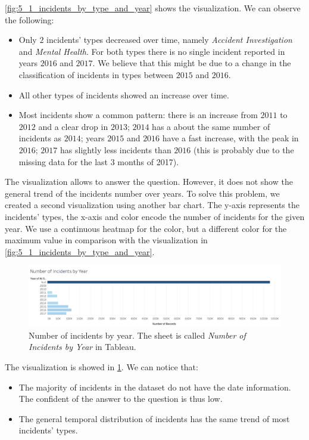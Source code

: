 \cref{fig:5_1_incidents_by_type_and_year} shows the visualization.
We can observe the following:
\begin{itemize}
    \item Only $2$ incidents' types decreased over time, namely \textit{Accident Investigation} and \textit{Mental Health}. For both types there is no single incident reported in years $2016$ and $2017$. We believe that this might be due to a change in the classification of incidents in types between $2015$ and $2016$.
    \item All other types of incidents showed an increase over time.
    \item Most incidents show a common pattern: there is an increase from $2011$ to $2012$ and a clear drop in $2013$; $2014$ has a about the same number of incidents as $2014$; years $2015$ and $2016$ have a fast increase, with the peak in $2016$; $2017$ has slightly less incidents than $2016$ (this is probably due to the missing data for the last $3$ months of 2017).
\end{itemize}

The visualization allows to answer the question.
However, it does not show the general trend of the incidents number over years.
To solve this problem, we created a second visualization using another bar chart.
The y-axis represents the incidents' types, the x-axis and color encode the number of incidents for the given year.
We use a continuous heatmap for the color, but a different color for the maximum value in comparison with the visualization in \cref{fig:5_1_incidents_by_type_and_year}.

\begin{figure}[h]
	\centering
	\includegraphics[width=0.9\columnwidth]{figures/5_1_incidents_by_year}
	\caption{Number of incidents by year. The sheet is called \textit{Number of Incidents by Year} in Tableau.}
	\label{fig:5_1_incidents_by_year}
\end{figure}

The visualization is showed in \cref{fig:5_1_incidents_by_year}.
We can notice that:
\begin{itemize}
    \item The majority of incidents in the dataset do not have the date information. The confident of the answer to the question is thus low.
    \item The general temporal distribution of incidents has the same trend of most incidents' types.
\end{itemize} 

